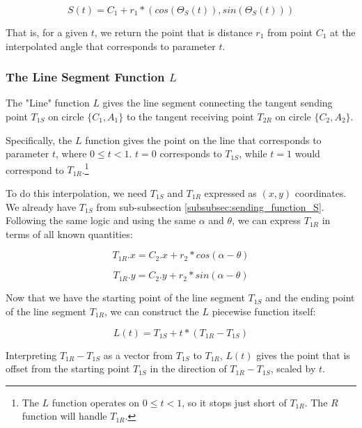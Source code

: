 \documentclass{article}
\begin{document}
\begin{equation}
    \label{eq:S(t)}
    S(t) = C_1 + r_1 * ( cos( \Theta_S(t) ),  sin( \Theta_S(t) ) )
\end{equation} 

That is, for a given $t$, we return the point that is distance $r_1$ from point $C_1$ at the interpolated angle that corresponds to parameter $t$.


\subsubsection{The Line Segment Function $L$}
\label{subsubsec:line_segment_function_L}
The "Line" function $L$ gives the line segment connecting the tangent sending point $T_{1S}$ on circle $\{C_1, A_1\}$ to the tangent receiving point $T_{2R}$ on circle $\{C_2, A_2\}$.

Specifically, the $L$ function gives the point on the line that corresponds to parameter $t$, where $0 \leq t < 1$. $t = 0$ corresponds to $T_{1S}$, while $t = 1$ would correspond to $T_{1R}$.\footnote{The $L$ function operates on $0 \leq t < 1$, so it stops just short of $T_{1R}$. The $R$ function will handle $T_{1R}$.}

To do this interpolation, we need $T_{1S}$ and $T_{1R}$ expressed as $(x,y)$ coordinates. We already have $T_{1S}$ from sub-subsection \ref{subsubsec:sending_function_S}. Following the same logic and using the same $\alpha$ and $\theta$, we can express $T_{1R}$ in terms of all known quantities:

\begin{equation}
    \label{eq:T_1R.x}
    T_{1R}.x = C_2.x + r_2 * cos(\alpha - \theta)
\end{equation}

\begin{equation}
    \label{eq:T_1R.y}
    T_{1R}.y = C_2.y + r_2 * sin(\alpha - \theta)
\end{equation}

Now that we have the starting point of the line segment $T_{1S}$ and the ending point of the line segment $T_{1R}$, we can construct the $L$ piecewise function itself:

\begin{equation}
    \label{eq:L(t)}
    L(t) = T_{1S} + t * ( T_{1R} - T_{1S} )
\end{equation}

Interpreting $T_{1R} - T_{1S}$ as a vector from $T_{1S}$ to $T_{1R}$, $L(t)$ gives the point that is offset from the starting point $T_{1S}$ in the direction of $T_{1R} - T_{1S}$, scaled by $t$.
\end{document}
